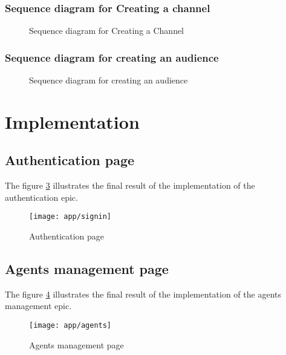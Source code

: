 \subsubsection{Sequence diagram for Creating a channel}

\begin{landscape}
    \begin{figure}[hbt!]
        \centering
        
        \caption{Sequence diagram for Creating a Channel}
        \label{seq-create-channel}
    \end{figure}
\end{landscape}

\subsubsection{Sequence diagram for creating an audience}

\begin{landscape}
    \begin{figure}[hbt!]
        \centering
        
        \caption{Sequence diagram for creating an audience}
        \label{seq-create-audience}
    \end{figure}
\end{landscape}


\section{Implementation}
\subsection{Authentication page}
The figure \ref{ss-signin} illustrates the final result of the implementation of the authentication epic.
\begin{figure}[hbt!]
    \centering
    \texttt{[image: app/signin]}
    \caption{Authentication page}
    \label{ss-signin}
\end{figure}

\subsection{Agents management page}
The figure \ref{ss-agents} illustrates the final result of the implementation of the agents management epic.
\begin{figure}[hbt!]
    \centering
    \texttt{[image: app/agents]}
    \caption{Agents management page}
    \label{ss-agents}
\end{figure}

